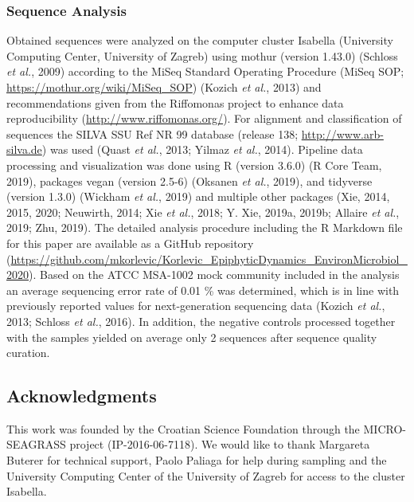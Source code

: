\documentclass[12pt,]{article}
\begin{document}
\hypertarget{sequence-analysis}{%
\subsubsection{Sequence Analysis}\label{sequence-analysis}}

Obtained sequences were analyzed on the computer cluster Isabella
(University Computing Center, University of Zagreb) using mothur
(version 1.43.0) (Schloss \emph{et al.}, 2009) according to the MiSeq
Standard Operating Procedure (MiSeq SOP;
\url{https://mothur.org/wiki/MiSeq_SOP}) (Kozich \emph{et al.}, 2013)
and recommendations given from the Riffomonas project to enhance data
reproducibility (\url{http://www.riffomonas.org/}). For alignment and
classification of sequences the SILVA SSU Ref NR 99 database (release
138; \url{http://www.arb-silva.de}) was used (Quast \emph{et al.}, 2013;
Yilmaz \emph{et al.}, 2014). Pipeline data processing and visualization
was done using R (version 3.6.0) (R Core Team, 2019), packages vegan
(version 2.5-6) (Oksanen \emph{et al.}, 2019), and tidyverse (version
1.3.0) (Wickham \emph{et al.}, 2019) and multiple other packages (Xie,
2014, 2015, 2020; Neuwirth, 2014; Xie \emph{et al.}, 2018; Y. Xie,
2019a, 2019b; Allaire \emph{et al.}, 2019; Zhu, 2019). The detailed
analysis procedure including the R Markdown file for this paper are
available as a GitHub repository
(\url{https://github.com/mkorlevic/Korlevic_EpiphyticDynamics_EnvironMicrobiol_2020}).
Based on the ATCC MSA-1002 mock community included in the analysis an
average sequencing error rate of 0.01 \si{\percent} was determined,
which is in line with previously reported values for next-generation
sequencing data (Kozich \emph{et al.}, 2013; Schloss \emph{et al.},
2016). In addition, the negative controls processed together with the
samples yielded on average only 2 sequences after sequence quality
curation.

\hypertarget{acknowledgments}{%
\subsection{Acknowledgments}\label{acknowledgments}}

This work was founded by the Croatian Science Foundation through the
MICRO-SEAGRASS project (IP-2016-06-7118). We would like to thank
Margareta Buterer for technical support, Paolo Paliaga for help during
sampling and the University Computing Center of the University of Zagreb
for access to the cluster Isabella.

\newpage
\end{document}
